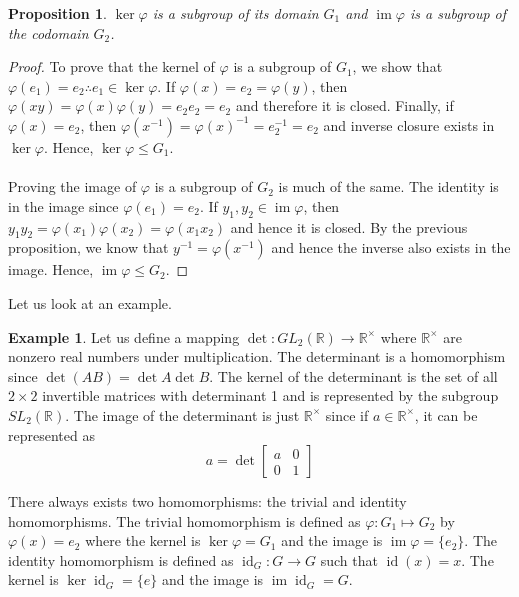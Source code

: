 \documentclass{article}
\newcommand{\R}{\mathbb{R}}
\DeclareMathOperator{\im}{im}
\DeclareMathOperator{\id}{id}
\newtheorem{proposition}[theorem]{Proposition}
\theoremstyle{definition}
\newtheorem{example}[theorem]{Example}
\begin{document}
\begin{proposition}
    $\ker \varphi$ is a subgroup of its domain $G_1$ and $\im \varphi$ is a subgroup of the codomain $G_2$.
\end{proposition}
\begin{proof}
    To prove that the kernel of $\varphi$ is a subgroup of $G_1$, we show that $\varphi(e_1)=e_2 \therefore e_1\in \ker \varphi$. If $\varphi(x)=e_2=\varphi(y)$, then $\varphi (xy)=\varphi(x)\varphi(y)=e_2e_2=e_2$ and therefore it is closed. Finally, if $\varphi(x)=e_2$, then $\varphi(x^{-1})=\varphi(x)^{-1} = e_2^{-1}=e_2$ and inverse closure exists in $\ker \varphi$. Hence, $\ker \varphi \leq G_1$. \\\\
    Proving the image of $\varphi$ is a subgroup of $G_2$ is much of the same. The identity is in the image since $\varphi(e_1)=e_2$. If $y_1,y_2\in \im \varphi$, then $y_1y_2=\varphi(x_1)\varphi(x_2)=\varphi(x_1x_2)$ and hence it is closed. By the previous proposition, we know that $y^{-1} = \varphi(x^{-1})$ and hence the inverse also exists in the image. Hence, $\im \varphi \leq G_2$.
\end{proof}
Let us look at an example. 
\begin{example}
    Let us define a mapping $\det :GL_2(\R) \rightarrow \R^{\times}$ where $\R^{\times}$ are nonzero real numbers under multiplication. The determinant is a homomorphism since $\det(AB)=\det A \det B$. The kernel of the determinant is the set of all $2\times2$ invertible matrices with determinant 1 and is represented by the subgroup $SL_2(\R)$. The image of the determinant is just $\R^{\times}$ since if $a\in \R^{\times}$, it can be represented as
    \begin{equation*}
        a=\det \begin{bmatrix}
            a&0\\0&1
        \end{bmatrix}
    \end{equation*}
\end{example}
There always exists two homomorphisms: the trivial and identity homomorphisms. The trivial homomorphism is defined as $\varphi : G_1 \mapsto G_2$ by $\varphi (x) = e_2$ where the kernel is $\ker \varphi = G_1$ and the image is $\im \varphi = \{e_2\}$. The identity homomorphism is defined as $\id_G :G\to G$ such that $\id (x)=x$. The kernel is $\ker \id_G = \{ e\}$ and the image is $\im \id_G = G$.
\end{document}
